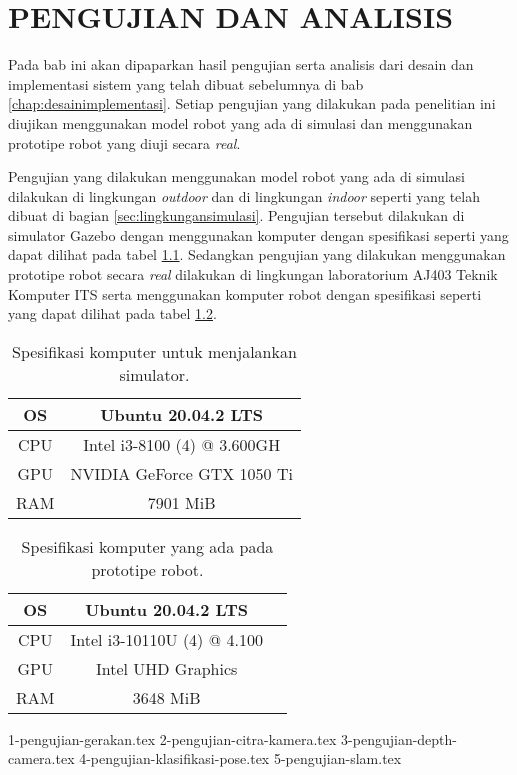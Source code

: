 \chapter{PENGUJIAN DAN ANALISIS}
\label{chap:pengujiananalisis}

Pada bab ini akan dipaparkan hasil pengujian serta analisis dari desain dan implementasi sistem yang telah dibuat sebelumnya di bab \ref{chap:desainimplementasi}.
Setiap pengujian yang dilakukan pada penelitian ini diujikan menggunakan model robot yang ada di simulasi dan menggunakan prototipe robot yang diuji secara \emph{real}.

Pengujian yang dilakukan menggunakan model robot yang ada di simulasi dilakukan di lingkungan \emph{outdoor} dan di lingkungan \emph{indoor} seperti yang telah dibuat di bagian \ref{sec:lingkungansimulasi}.
Pengujian tersebut dilakukan di simulator Gazebo dengan menggunakan komputer dengan spesifikasi seperti yang dapat dilihat pada tabel \ref{tb:spesifikasikomputersimulator}.
Sedangkan pengujian yang dilakukan menggunakan prototipe robot secara \emph{real} dilakukan di lingkungan laboratorium AJ403 Teknik Komputer ITS serta menggunakan komputer robot dengan spesifikasi seperti yang dapat dilihat pada tabel \ref{tb:spesifikasikomputerrobot}.

\begin{longtable}{|c|c|}
  \caption{Spesifikasi komputer untuk menjalankan simulator.}
  \label{tb:spesifikasikomputersimulator}\\
  \hline
  OS  & Ubuntu 20.04.2 LTS \\
  \hline
  CPU & Intel i3-8100 (4) @ 3.600GH \\
  \hline
  GPU & NVIDIA GeForce GTX 1050 Ti \\
  \hline
  RAM & 7901 MiB \\
  \hline
\end{longtable}

\begin{longtable}{|c|c|c|}
  \caption{Spesifikasi komputer yang ada pada prototipe robot.}
  \label{tb:spesifikasikomputerrobot}\\
  \hline
  OS  & Ubuntu 20.04.2 LTS \\
  \hline
  CPU & Intel i3-10110U (4) @ 4.100 \\
  \hline
  GPU & Intel UHD Graphics \\
  \hline
  RAM & 3648 MiB \\
  \hline
\end{longtable}

{1-pengujian-gerakan.tex}
{2-pengujian-citra-kamera.tex}
{3-pengujian-depth-camera.tex}
{4-pengujian-klasifikasi-pose.tex}
{5-pengujian-slam.tex}

